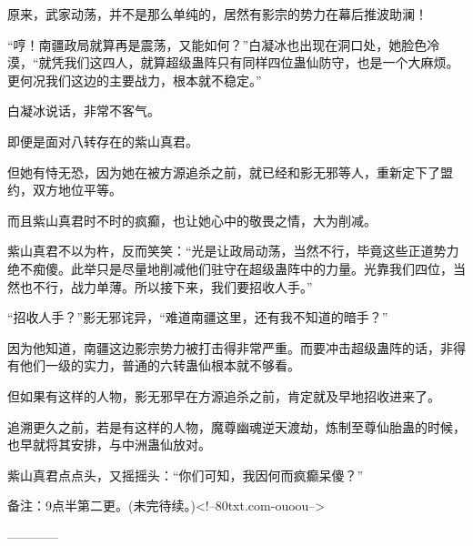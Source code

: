 \begin{this_body}
原来，武家动荡，并不是那么单纯的，居然有影宗的势力在幕后推波助澜！

“哼！南疆政局就算再是震荡，又能如何？”白凝冰也出现在洞口处，她脸色冷漠，“就凭我们这四人，就算超级蛊阵只有同样四位蛊仙防守，也是一个大麻烦。更何况我们这边的主要战力，根本就不稳定。”

白凝冰说话，非常不客气。

即便是面对八转存在的紫山真君。

但她有恃无恐，因为她在被方源追杀之前，就已经和影无邪等人，重新定下了盟约，双方地位平等。

而且紫山真君时不时的疯癫，也让她心中的敬畏之情，大为削减。

紫山真君不以为杵，反而笑笑：“光是让政局动荡，当然不行，毕竟这些正道势力绝不痴傻。此举只是尽量地削减他们驻守在超级蛊阵中的力量。光靠我们四位，当然也不行，战力单薄。所以接下来，我们要招收人手。”

“招收人手？”影无邪诧异，“难道南疆这里，还有我不知道的暗手？”

因为他知道，南疆这边影宗势力被打击得非常严重。而要冲击超级蛊阵的话，非得有他们一级的实力，普通的六转蛊仙根本就不够看。

但如果有这样的人物，影无邪早在方源追杀之前，肯定就及早地招收进来了。

追溯更久之前，若是有这样的人物，魔尊幽魂逆天渡劫，炼制至尊仙胎蛊的时候，也早就将其安排，与中洲蛊仙放对。

紫山真君点点头，又摇摇头：“你们可知，我因何而疯癫呆傻？”

备注：9点半第二更。(未完待续。)<!--80txt.com-ouoou-->

------------

\end{this_body}

